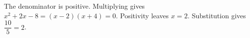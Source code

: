 The denominator is positive. Multiplying gives $ x^2+2x-8=(x-2)(x+4)=0 $. Positivity leaves $\boxed{x=2}$. Substitution gives $\dfrac{10}{5}=2 $.
